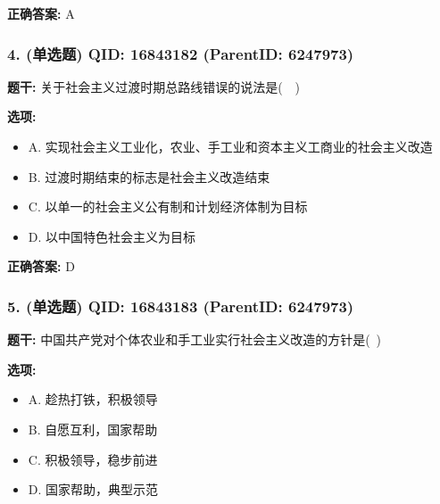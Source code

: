 \documentclass[12pt,UTF8]{ctexart}
\begin{document}
\textbf{正确答案:}
A

\vspace{0.3em}\hrulefill\vspace{0.7em}

\subsubsection*{4. (单选题) \small QID: 16843182 (ParentID: 6247973)}

\textbf{题干:}
关于社会主义过渡时期总路线错误的说法是(  )



\textbf{选项:}
\begin{itemize}[leftmargin=*]

  \item A. 实现社会主义工业化，农业、手工业和资本主义工商业的社会主义改造

  \item B. 过渡时期结束的标志是社会主义改造结束

  \item C. 以单一的社会主义公有制和计划经济体制为目标

  \item D. 以中国特色社会主义为目标

\end{itemize}

\textbf{正确答案:}
D

\vspace{0.3em}\hrulefill\vspace{0.7em}

\subsubsection*{5. (单选题) \small QID: 16843183 (ParentID: 6247973)}

\textbf{题干:}
中国共产党对个体农业和手工业实行社会主义改造的方针是( )



\textbf{选项:}
\begin{itemize}[leftmargin=*]

  \item A. 趁热打铁，积极领导

  \item B. 自愿互利，国家帮助

  \item C. 积极领导，稳步前进

  \item D. 国家帮助，典型示范

\end{itemize}
\end{document}
